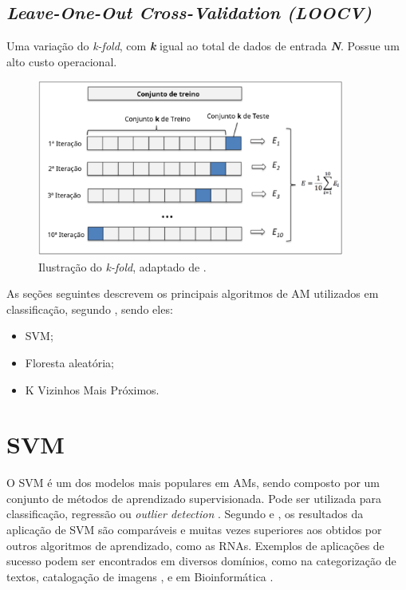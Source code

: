 \subsection{\textit{Leave-One-Out Cross-Validation (LOOCV)}} Uma variação do \textit{k-fold}, com \textbf{\textit{k}} igual ao total de dados de entrada \textbf{\textit{N}}. Possue um alto custo operacional.

\begin{figure}[!htb]
    \centering
     \includegraphics[width=0.9\textwidth]{figuras/kfold.eps}
     \caption{Ilustração do \textit{k-fold}, adaptado de .}
     \label{kfold}
\end{figure}

As seções seguintes descrevem os principais algoritmos de AM utilizados em classificação, segundo , sendo eles:
\begin{itemize}
    \item SVM;
    \item Floresta aleatória;
    \item K Vizinhos Mais Próximos.
\end{itemize}

\section{SVM}

O SVM é um dos modelos mais populares em AMs, sendo composto por um conjunto de métodos de aprendizado supervisionada. Pode ser utilizada para classificação, regressão ou \textit{outlier detection} \cite{scikitlearn}. Segundo  e , os resultados da aplicação de SVM são comparáveis e muitas vezes superiores aos obtidos por outros algoritmos de aprendizado, como as RNAs. Exemplos de aplicações de sucesso podem ser encontrados em diversos domínios, como na categorização de textos,  catalogação de imagens \cite{pontil1998support}, e em Bioinformática \cite{noble2004support}.

